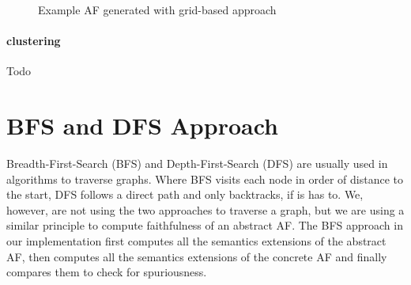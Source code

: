 \begin{figure}[h]
\begin{minipage}{.5\textwidth}
    \label{af:ImplementationLevelBasedExampleAFsb}
\end{minipage}%
\caption{Example AF generated with grid-based approach}
\label{fig:ImplementationLevelBasedExampleAFs}
\end{figure}
\vspace{0.3cm}

\paragraph{clustering} Todo


\newpage
\section{BFS and DFS Approach}
\label{sec:ImplementationsBFSandDFSApproach}
Breadth-First-Search (BFS) and Depth-First-Search (DFS) are usually used in algorithms to traverse graphs. Where BFS visits each node in order of distance to the start, DFS follows a direct path and only backtracks, if is has to. We, however, are not using the two approaches to traverse a graph, but we are using a similar principle to compute faithfulness of an abstract AF. The BFS approach in our implementation first computes all the semantics extensions of the abstract AF, then computes all the semantics extensions of the concrete AF and finally compares them to check for spuriousness.

